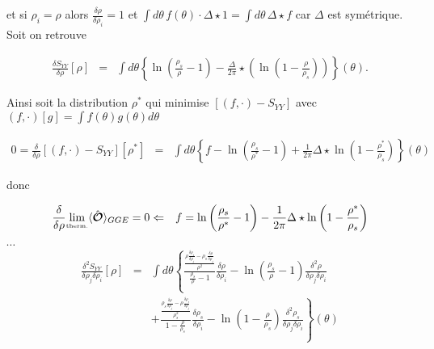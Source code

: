 	et si $\rho_i = \rho$ alors $\frac{\delta \rho }{ \delta \rho_i } = 1 $ et $\int d \theta \, f (\theta ) \cdot \Delta \star 1 = \int d \theta \,  \Delta \star f $ car $\Delta$ est symétrique. 	Soit on retrouve 

	
	\begin{eqnarray}
		\frac{ \delta S_{YY} }{ \delta \rho } [\rho ]  & = & \int d \theta \left \{ \ln \left ( \frac{ \rho_s}{ \rho} - 1 \right ) - \frac{ \Delta}{2 \pi} \star \left ( \ln \left ( 1 - \frac{ \rho}{ \rho_s}\right ) \right ) \right \} ( \theta )	.	
	\end{eqnarray}

	
	

	
	Ainsi soit la distribution $\rho^\ast$ qui minimise $\left [ (   f ,  \cdot  )  - S_{YY}  \right ]$ avec $(   f ,  \cdot  )[g] =  \int  f(\theta) g(\theta )  d\theta$
	 
	
	\begin{eqnarray}
		0 = \frac{\delta}{\delta \rho} \left [ (   f ,  \cdot  )  - S_{YY}  \right ][\rho^\ast ] & = & 	\int  d\theta\left \{ f - \ln \left ( \frac{ \rho_s}{ \rho^\ast } - 1 \right ) + \frac{1}{2 \pi} \Delta \star \ln \left ( 1 - \frac{ \rho^\ast }{ \rho_s}\right )  \right \} (\theta )
	\end{eqnarray}
	
	
	
	donc 
	
	\begin{eqnarray} 
		\frac{\delta}{\delta \rho}	\underset{\mbox{\tiny therm.}}{\lim} \langle \hat{\bm{\mathcal{O}}}\rangle_{GGE} = 0 & \Leftarrow & f = \ln \left ( \frac{ \rho_s}{ \rho^\ast } - 1 \right ) - \frac{1}{2 \pi} \Delta \star \ln \left ( 1 - \frac{ \rho^\ast }{ \rho_s}\right )		
	\end{eqnarray}
	
 
	
	{\color{red} $\cdots$}\\
	
	\begin{eqnarray}
		\frac{ \delta^2 S_{YY} }{ \delta \rho_j\delta \rho_i } [\rho ]  & = &\int  d\theta\left \{ \frac{\frac{\rho \frac{\delta \rho_s}{\delta \rho_j}- \rho_s\frac{\delta \rho}{\delta \rho_j}}{\rho^2}}{\frac{\rho_s}{\rho} -1}\frac{\delta \rho}{\delta \rho_i}  - \ln \left ( \frac{ \rho_s}{ \rho} - 1 \right )\frac{\delta^2 \rho}{\delta \rho_j\delta \rho_i} \right .\\
		& & +\left .  \frac{\frac{\rho_s \frac{\delta \rho}{\delta \rho_j}- \rho\frac{\delta \rho_s}{\delta \rho_j}}{\rho_s^2}}{1 - \frac{\rho}{\rho_s}}\frac{\delta \rho_s}{\delta \rho_i}  - \ln \left (1- \frac{ \rho}{ \rho_s}  \right )\frac{\delta^2 \rho_s}{\delta \rho_j\delta \rho_i}\right \} ( \theta ) 
	\end{eqnarray}
	
